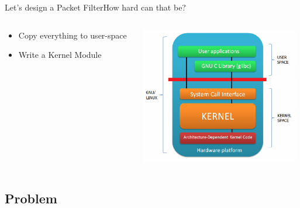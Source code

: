 \documentclass{beamer}
\begin{document}
\begin{frame}{Let's design a Packet Filter}{How hard can that be?}
\begin{columns}[T]
\begin{column}{0.4\textwidth}
\begin{center}
      \begin{itemize}
      \item \LARGE{Copy everything to user-space}
      \end{itemize}
     \vspace{15mm} 
      \begin{itemize}
      \item \LARGE{Write a Kernel Module}
      \end{itemize}
\end{center}
\end{column}
\begin{column}{0.6\textwidth}
      \includegraphics[height=6cm]{userspace-kernelspace.png}
\end{column}
\end{columns}

\end{frame}

\subsection{Problem}
\end{document}
